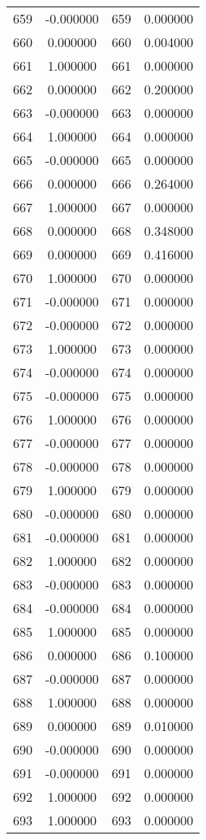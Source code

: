 \documentclass[12pt]{article}
\begin{document}
\begin{longtable}{@{}cccc@{}}
659 & -0.000000 & 659 & 0.000000 \\
660 & 0.000000 & 660 & 0.004000 \\
661 & 1.000000 & 661 & 0.000000 \\
662 & 0.000000 & 662 & 0.200000 \\
663 & -0.000000 & 663 & 0.000000 \\
664 & 1.000000 & 664 & 0.000000 \\
665 & -0.000000 & 665 & 0.000000 \\
666 & 0.000000 & 666 & 0.264000 \\
667 & 1.000000 & 667 & 0.000000 \\
668 & 0.000000 & 668 & 0.348000 \\
669 & 0.000000 & 669 & 0.416000 \\
670 & 1.000000 & 670 & 0.000000 \\
671 & -0.000000 & 671 & 0.000000 \\
672 & -0.000000 & 672 & 0.000000 \\
673 & 1.000000 & 673 & 0.000000 \\
674 & -0.000000 & 674 & 0.000000 \\
675 & -0.000000 & 675 & 0.000000 \\
676 & 1.000000 & 676 & 0.000000 \\
677 & -0.000000 & 677 & 0.000000 \\
678 & -0.000000 & 678 & 0.000000 \\
679 & 1.000000 & 679 & 0.000000 \\
680 & -0.000000 & 680 & 0.000000 \\
681 & -0.000000 & 681 & 0.000000 \\
682 & 1.000000 & 682 & 0.000000 \\
683 & -0.000000 & 683 & 0.000000 \\
684 & -0.000000 & 684 & 0.000000 \\
685 & 1.000000 & 685 & 0.000000 \\
686 & 0.000000 & 686 & 0.100000 \\
687 & -0.000000 & 687 & 0.000000 \\
688 & 1.000000 & 688 & 0.000000 \\
689 & 0.000000 & 689 & 0.010000 \\
690 & -0.000000 & 690 & 0.000000 \\
691 & -0.000000 & 691 & 0.000000 \\
692 & 1.000000 & 692 & 0.000000 \\
693 & 1.000000 & 693 & 0.000000 \\

\end{longtable}
\end{document}
